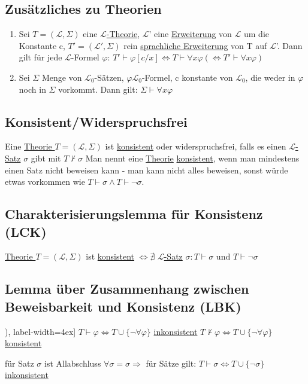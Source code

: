 \documentclass[12pt,a4paper]{article} %
\begin{document}
	\subsection{Zusätzliches zu Theorien}
	\begin{enumerate}
		\item Sei $T = (\mathcal{L}, \Sigma)$ eine \hyperref[Theorie]{$\mathcal{L}$-Theorie}, $\mathcal{L}$' eine \hyperref[Erweiterung]{Erweiterung} von $\mathcal{L}$ um die Konstante c, $T' = (\mathcal{L}', \Sigma)$ rein \hyperref[SprachlicheErweiterung]{sprachliche Erweiterung} von T auf $\mathcal{L}$'. Dann gilt für jede $\mathcal{L}$-Formel $\varphi$: $T' \hyperref[Beweisbar]{\vdash} \varphi[c/x] \Leftrightarrow T \hyperref[Beweisbar]{\vdash} \forall x \varphi (\Leftrightarrow T' \hyperref[Beweisbar]{\vdash} \forall x \varphi)$
		\item Sei $\Sigma$ Menge von $\mathcal{L}_0$-Sätzen, $\varphi \mathcal{L}_0$-Formel, c konstante von $\mathcal{L}_0$, die weder in $\varphi$ noch in $\Sigma$ vorkommt. Dann gilt: $\Sigma \hyperref[Beweisbar]{\vdash} \forall x \varphi$
	\end{enumerate}
	
	\subsection{Konsistent/Widerspruchsfrei}
	\label{PLKonsistent}
	Eine \hyperref[Theorie]{Theorie $T = (\mathcal{L}, \Sigma)$} ist \hyperref[PLKonsistent]{konsistent} oder widerspruchsfrei, falls es einen
	\hyperref[LSatz]{$\mathcal{L}$-Satz} $\sigma$ gibt mit $T \nvdash \sigma$
	Man nennt eine \hyperref[Theorie]{Theorie} \hyperref[PLKonsistent]{konsistent}, wenn man mindestens einen Satz
	nicht beweisen kann - man kann nicht alles beweisen, sonst würde etwas 
	vorkommen wie $T \hyperref[Beweisbar]{\vdash} \sigma \land T \hyperref[Beweisbar]{\vdash} \neg \sigma$.
	
	\subsection{Charakterisierungslemma für Konsistenz (LCK)}
	\hyperref[Theorie]{Theorie $T = (\mathcal{L}, \Sigma)$} ist \hyperref[PLKonsistent]{konsistent} $\Leftrightarrow \nexists$ \hyperref[LSatz]{$\mathcal{L}$-Satz} $\sigma : T \hyperref[Beweisbar]{\vdash} \sigma$ und $T \hyperref[Beweisbar]{\vdash} \neg \sigma$
	
	\subsection{Lemma über Zusammenhang zwischen Beweisbarkeit und Konsistenz (LBK)}
	\begin{tasks}[counter-format=(tsk[r]), label-width=4ex]
		\task $T \hyperref[Beweisbar]{\vdash} \varphi \Leftrightarrow T \cup \{\neg \forall \varphi\}$ \hyperref[PLKonsistent]{inkonsistent}
		\task $T \nvdash \varphi \Leftrightarrow T \cup \{\neg \forall \varphi\}$ \hyperref[PLKonsistent]{konsistent}
	\end{tasks}
	für Satz $\sigma$ ist Allabschluss $\forall \sigma = \sigma \Rightarrow$ für Sätze gilt: $T \hyperref[Beweisbar]{\vdash} \sigma \Leftrightarrow T \cup \{\neg \sigma\}$ \hyperref[PLKonsistent]{inkonsistent}
	
\end{document}
